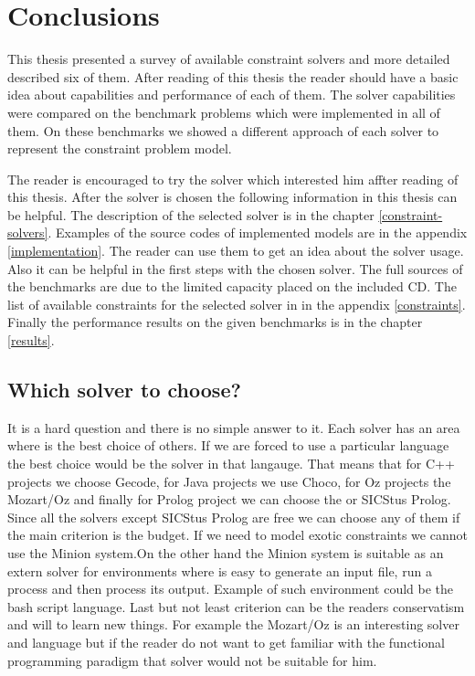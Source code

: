 \chapter{Conclusions}

This thesis presented a survey of available constraint solvers and more detailed 
described six of them. After reading of this thesis the reader should have a 
basic idea about capabilities and performance of each of them. The solver capabilities 
were compared on the benchmark problems which were implemented in all of them.
On these benchmarks we showed a different approach of each solver to represent
the constraint problem model. 

The reader is encouraged to try the solver which interested him affter reading of this thesis. 
After the solver is chosen the following information in this thesis can be helpful. 
The description of the selected solver is in the chapter \ref{constraint-solvers}.
Examples of the source codes of implemented models are in the appendix \ref{implementation}.
The reader can use them to get an idea about the solver usage. Also it can 
be helpful in the first steps with the chosen solver. The full sources of the benchmarks
are due to the limited capacity placed on the included CD. The list of available constraints
for the selected solver in in the appendix \ref{constraints}. Finally the performance results
 on the given benchmarks is in the chapter \ref{results}.
 
\section{Which solver to choose?}
It is a hard question and there is no simple answer to it. Each solver has an area where
is the best choice of others. If we are forced to use a particular language the best choice
would be the solver in that langauge. That means that for C++ projects we choose Gecode,
for Java projects we use Choco, for Oz projects the Mozart/Oz and finally for Prolog
project we can choose the \eclipse or SICStus Prolog. Since all the solvers except SICStus Prolog are free
we can choose any of them if the main criterion is the budget. If we need to model 
exotic constraints we cannot use the Minion system.On the other hand the Minion system
is suitable as an extern solver for environments where is easy to generate an input
file, run a process and then process its output. Example of such environment could
be the bash script language. Last but not least criterion can be the readers conservatism and 
will to learn new things. For example the Mozart/Oz is an interesting solver and language
but if the reader do not want to get familiar with the functional programming paradigm that solver would
not be suitable for him.

